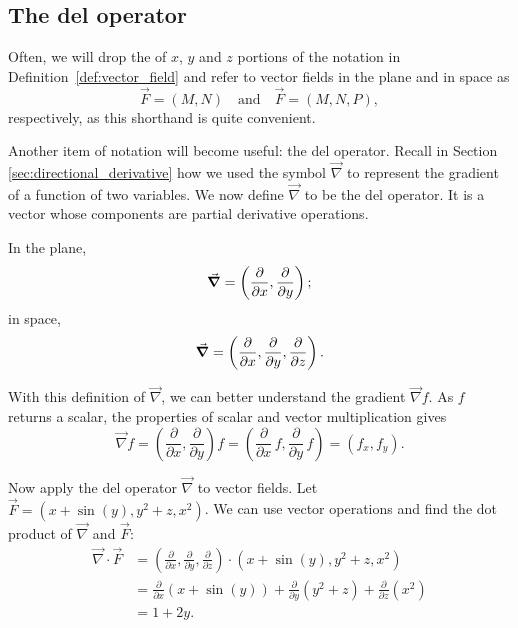 \subsection{The del operator}
Often, we will drop the of $x$, $y$ and $z$ portions of the notation in Definition~\ref{def:vector_field} and refer to vector fields in the plane and in space as 
$$\vec F = \left( M, N\right) \quad \text{and} \quad \vec F  = \left( M,N,P\right),$$ respectively, as this shorthand is quite convenient.

Another item of notation will become useful: the del operator. Recall in Section \ref{sec:directional_derivative} how we used the symbol $\vec{\nabla}$  to represent the gradient of a function of two variables. We now define $\vec{\nabla}$ to be the del operator. It is a vector whose components are partial derivative operations. 

In the plane, 
$$\ds\vec{\nabla} = \left( \frac{\partial}{\partial x}, \frac{\partial}{\partial y}\right);$$
in space, 
$$\ds\vec{\nabla} = \left( \frac{\partial}{\partial x}, \frac{\partial}{\partial y},\frac{\partial}{\partial z}\right).$$ 

With this definition of $\vec{\nabla}$, we can better understand the gradient $\vec{\nabla} f$. As $f$ returns a scalar, the properties of scalar and vector multiplication gives
$$\vec{\nabla} f = \left( \frac{\partial}{\partial x}, \frac{\partial}{\partial y}\right) f = \left( \frac{\partial}{\partial x}\,f, \frac{\partial}{\partial y}\,f\right) = \left( f_x, f_y\right).$$

Now apply the del operator $\vec{\nabla}$ to vector fields. Let $\vec F = \left( x+\sin(y),y^2+z,x^2\right)$. We can use vector operations and find the dot product of $\vec{\nabla}$ and $\vec F$:
\allowdisplaybreaks
\begin{align*}
\vec{\nabla} \cdot \vec F &=\left( \frac{\partial}{\partial x}, \frac{\partial}{\partial y},\frac{\partial}{\partial z}\right)\cdot  \left( x+\sin(y),y^2+z,x^2\right) \\
  &= \frac{\partial}{\partial x}\left(x+\sin(y)\right)+ \frac{\partial}{\partial y}\left(y^2+z\right) + \frac{\partial}{\partial z}\left(x^2\right) \\
		&=1+2y.
\end{align*}

